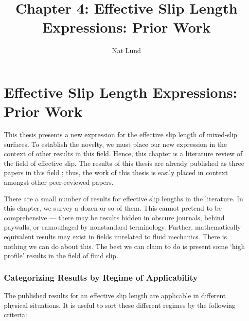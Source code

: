 \documentclass[12pt, a4paper, twoside, openright]{book}
\title{Chapter 4: Effective Slip Length Expressions: Prior Work}
\author{Nat Lund}
\begin{document}
\chapter{Effective Slip Length Expressions: Prior Work}\label{C:effslip}

This thesis presents a new expression for the effective slip length of mixed-slip surfaces.  To establish the novelty, we must place our new expression in the context of other results in this field.  Hence, this chapter is a literature review of the field of effective slip.  The results of this thesis are already published as three papers in this field \cite{HendyLund2007, LundHendy2008, Lund2012}; thus, the work of this thesis is easily placed in context amongst other peer-reviewed papers.

There are a small number of results for effective slip lengths in the literature.  In this chapter, we survey a dozen or so of them.  This cannot pretend to be comprehensive --- there may be results hidden in obscure journals, behind paywalls, or camouflaged by nonstandard terminology.  Further, mathematically equivalent results may exist in fields unrelated to fluid mechanics.  There is nothing we can do about this.  The best we can claim to do is present some `high profile' results in the field of fluid slip.


\subsection{Categorizing Results by Regime of Applicability}

The published results for an effective slip length are applicable in different physical situations.  It is useful to sort these different regimes by the following criteria:
\end{document}
